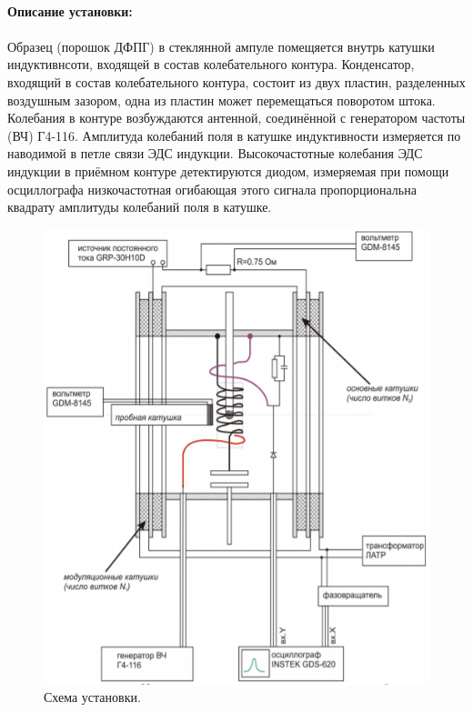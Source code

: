 \documentclass[a4paper,12pt]{article}
\begin{document}
\paragraph{Описание установки:}
\paragraph{}
Образец (порошок ДФПГ) в стеклянной ампуле помещяется внутрь катушки индуктивнсоти, входящей в состав колебательного контура. Конденсатор, входящий в состав колебательного контура, состоит из двух пластин, разделенных воздушным зазором, одна из пластин может перемещаться поворотом штока. \\ Колебания в контуре возбуждаются антенной, соединённой с генератором частоты (ВЧ) Г4-116. Амплитуда колебаний поля в катушке индуктивности измеряется по наводимой в петле связи ЭДС индукции. Высокочастотные колебания ЭДС индукции в приёмном контуре детектируются диодом, измеряемая при помощи осциллографа низкочастотная огибающая этого сигнала пропорциональна квадрату амплитуды колебаний поля в катушке.
	\begin{figure}[h!]
	    \centering
			\caption{Схема установки.}
			\label{fig:equip}
			\includegraphics[scale=0.7]{setup.png}
	\end{figure}
	
\end{document}
